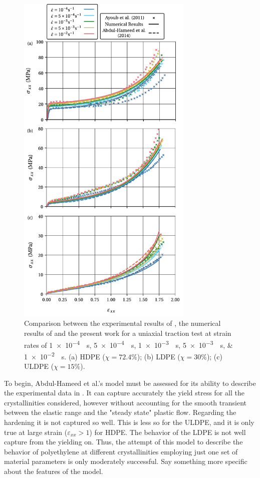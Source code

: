 \begin{figure}[hbtp]
  \centering
  \includegraphics[width=0.75\textwidth]{figures/stress_strain_abdul_hameed}
  \caption{Comparison between the experimental results of \cite{ayoubEffectsCrystalContent2011}, the numerical results of \cite{abdul-hameedTwophaseHyperelasticviscoplasticConstitutive2014} and the present work for a uniaxial traction test at strain rates of \SIlist{1e-4;5e-4;1e-3;5e-3;1e-2}{\per\second}. (a) HDPE ($\chi = 72.4\%$); (b) LDPE ($\chi = 30\%$); (c) ULDPE ($\chi = 15\%$).}
\label{fig:stress_strain_abdul_hameed}
\end{figure}

To begin, Abdul-Hameed et al.'s model \citep{abdul-hameedTwophaseHyperelasticviscoplasticConstitutive2014} must be assessed for its ability to describe the experimental data in \cite{ayoubEffectsCrystalContent2011}.
It can capture accurately the yield stress for all the crystallinities considered, however without accounting for the smooth transient between the elastic range and the "steady state" plastic flow.
Regarding the hardening it is not captured so well.
This is less so for the ULDPE, and it is only true at large strain ($\varepsilon_{xx}>1$) for HDPE.
The behavior of the LDPE is not well capture from the yielding on.
Thus, the attempt of this model to describe the behavior of polyethylene at different crystallinities employing just one set of material parameters is only moderately successful.
\colorbox{BrickRed}{Say something more specific about the features of the model.}

